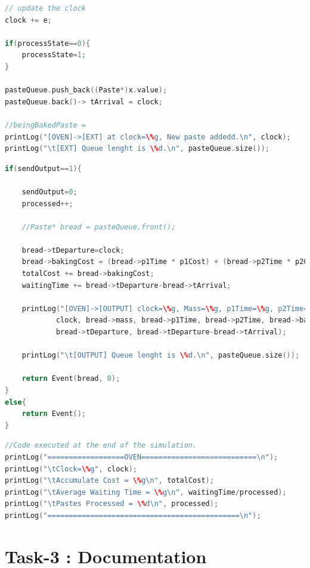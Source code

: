 \documentclass[titlepage]{article}%
\newcommand{\oven}{\texttt{Oven}~}
\newcommand{\extt}{\texttt{External Transition}~}
\newcommand{\out}{\texttt{Output}~}
\begin{document}
{\begin{lstlisting}[caption={\extt function for \oven}, language=c++, label={o_ext}]
// update the clock
clock += e;

if(processState==0){
	processState=1;	
}

pasteQueue.push_back((Paste*)x.value);
pasteQueue.back()-> tArrival = clock;

//beingBakedPaste = 
printLog("[OVEN]->[EXT] at clock=\%g, New paste addedd.\n", clock);
printLog("\t[EXT] Queue lenght is \%d.\n", pasteQueue.size());
\end{lstlisting}


\begin{lstlisting}[caption={\out function for \oven}, language=c++, label={o_output}]
if(sendOutput==1){

	sendOutput=0;
	processed++;

	//Paste* bread = pasteQueue.front();

	bread->tDeparture=clock;
	bread->bakingCost = (bread->p1Time * p1Cost) + (bread->p2Time * p2Cost);
	totalCost += bread->bakingCost;
	waitingTime += bread->tDeparture-bread->tArrival;

	printLog("[OVEN]->[OUTPUT] clock=\%g, Mass=\%g, p1Time=\%g, p2Time=\%g, Cost=\%g, Accumulated Cost=\%g, tArrival=\%g, tDepart=\%g, tWait=\%g\n", 
			clock, bread->mass, bread->p1Time, bread->p2Time, bread->bakingCost,totalCost, bread->tArrival, 
			bread->tDeparture, bread->tDeparture-bread->tArrival);

	printLog("\t[OUTPUT] Queue lenght is \%d.\n", pasteQueue.size());	
	
	return Event(bread, 0);
}
else{
	return Event();
}
\end{lstlisting}

\begin{lstlisting}[caption={Exit function for \oven}, language=c++, label={o_exit}]
//Code executed at the end of the simulation.
printLog("==================OVEN===========================\n");
printLog("\tClock=\%g", clock);
printLog("\tAccumulate Cost = \%g\n", totalCost);
printLog("\tAverage Waiting Time = \%g\n", waitingTime/processed);
printLog("\tPastes Processed = \%d\n", processed);
printLog("=============================================\n");
\end{lstlisting}


\section{Task-3 : Documentation}
}
\end{document}
